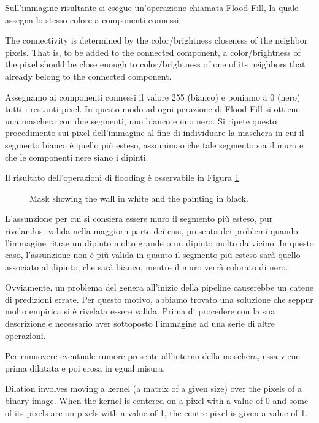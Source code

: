 \documentclass[10pt,twocolumn,letterpaper]{article}
\begin{document}
Sull'immagine risultante si esegue un'operazione chiamata Flood Fill, la quale assegna lo stesso colore a componenti connessi. 

The connectivity is determined by the color/brightness closeness of the neighbor pixels. That is, to be added to the connected component, a color/brightness of the pixel should be close enough to color/brightness of one of its neighbors that already belong to the connected component.

Assegnamo ai componenti connessi il valore 255 (bianco) e poniamo a 0 (nero) tutti i restanti pixel. In questo modo ad ogni perazione di Flood Fill si ottiene una maschera con due segmenti, uno bianco e uno nero. Si ripete questo procedimento sui pixel dell'immagine al fine di individuare la maschera in cui il segmento bianco è quello più esteso, assumimao che tale segmento sia il muro e che le componenti nere siano i dipinti.
 
Il risultato dell'operazioni di flooding è osservabile in Figura \ref{fig:maskLargestSegment} 

\begin{figure}[t]
   \begin{center}
   \fbox{\rule{0pt}{2in} \rule{0.9\linewidth}{0pt}}
   \end{center}
      \caption{Mask showing the wall in white and the painting in black.}
   \label{fig:maskLargestSegment}
\end{figure}

L'assunzione per cui si consiera essere muro il segmento più esteso, pur rivelandosi valida nella maggiorn parte dei casi, presenta dei problemi quando l'immagine ritrae un dipinto molto grande o un dipinto molto da vicino. In questo caso, l'assunzione non è più valida in quanto il segmento più esteso sarà quello associato al dipinto, che sarà bianco, mentre il muro verrà colorato di nero. 

Ovviamente, un problema del genera all'inizio della pipeline causerebbe un catene di predizioni errate. Per questo motivo, abbiamo trovato una soluzione che seppur molto empirica si è rivelata essere valida. Prima di procedere con la sua descrizione è necessario aver sottoposto l'immagine ad una serie di altre operazioni. 

Per rimuovere eventuale rumore presente all'interno della maschera, essa viene prima dilatata e poi erosa in egual misura. 

Dilation involves moving a kernel (a matrix of a given size) over the pixels of a binary image. When the kernel is centered on a pixel with a value of 0 and some of its pixels are on pixels with a value of 1, the centre pixel is given a value of 1.
\end{document}
